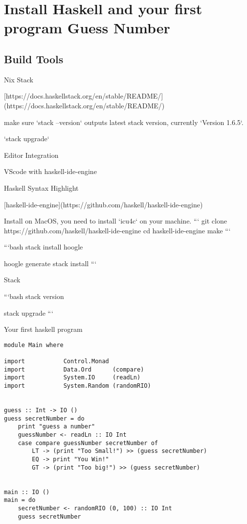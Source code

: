 \chapter{Install Haskell and your first program Guess Number}

 \section{Build Tools}

 Nix
 Stack

[https://docs.haskellstack.org/en/stable/README/](https://docs.haskellstack.org/en/stable/README/)

make sure `stack --version` outputs latest stack version, currently `Version 1.6.5`.

`stack upgrade`

 Editor Integration

 VScode with haskell-ide-engine

Haskell Syntax Highlight

[haskell-ide-engine](https://github.com/haskell/haskell-ide-engine)

Install on MacOS, you need to install `icu4c` on your machine.
```
git clone https://github.com/haskell/haskell-ide-engine
cd haskell-ide-engine
make
```


```bash
stack install hoogle

hoogle generate
stack install
```

 Stack

```bash
stack version

stack upgrade
```

 Your first haskell program


\begin{verbatim}
module Main where

import           Control.Monad
import           Data.Ord      (compare)
import           System.IO     (readLn)
import           System.Random (randomRIO)


guess :: Int -> IO ()
guess secretNumber = do
    print "guess a number"
    guessNumber <- readLn :: IO Int
    case compare guessNumber secretNumber of
        LT -> (print "Too Small!") >> (guess secretNumber)
        EQ -> print "You Win!"
        GT -> (print "Too big!") >> (guess secretNumber)


main :: IO ()
main = do
    secretNumber <- randomRIO (0, 100) :: IO Int
    guess secretNumber

\end{verbatim}
